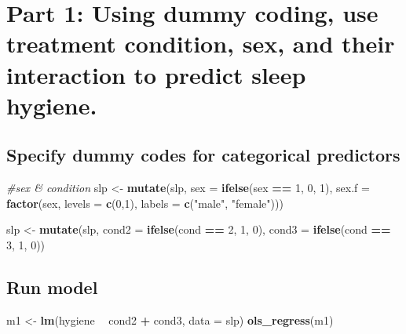 \documentclass[]{article}
\newenvironment{Shaded}{\begin{snugshade}}{\end{snugshade}}
\newcommand{\KeywordTok}[1]{\textcolor[rgb]{0.13,0.29,0.53}{\textbf{#1}}}
\newcommand{\DataTypeTok}[1]{\textcolor[rgb]{0.13,0.29,0.53}{#1}}
\newcommand{\DecValTok}[1]{\textcolor[rgb]{0.00,0.00,0.81}{#1}}
\newcommand{\StringTok}[1]{\textcolor[rgb]{0.31,0.60,0.02}{#1}}
\newcommand{\CommentTok}[1]{\textcolor[rgb]{0.56,0.35,0.01}{\textit{#1}}}
\newcommand{\OperatorTok}[1]{\textcolor[rgb]{0.81,0.36,0.00}{\textbf{#1}}}
\newcommand{\NormalTok}[1]{#1}
\begin{document}
\section{Part 1: Using dummy coding, use treatment condition, sex, and
their interaction to predict sleep
hygiene.}\label{part-1-using-dummy-coding-use-treatment-condition-sex-and-their-interaction-to-predict-sleep-hygiene.}

\subsection{Specify dummy codes for categorical
predictors}\label{specify-dummy-codes-for-categorical-predictors}

\begin{Shaded}
\begin{Highlighting}[]
\CommentTok{#sex & condition}
\NormalTok{slp <-}\StringTok{ }\KeywordTok{mutate}\NormalTok{(slp, }
              \DataTypeTok{sex =} \KeywordTok{ifelse}\NormalTok{(sex }\OperatorTok{==}\StringTok{ }\DecValTok{1}\NormalTok{, }\DecValTok{0}\NormalTok{, }\DecValTok{1}\NormalTok{),}
              \DataTypeTok{sex.f =} \KeywordTok{factor}\NormalTok{(sex, }\DataTypeTok{levels =} \KeywordTok{c}\NormalTok{(}\DecValTok{0}\NormalTok{,}\DecValTok{1}\NormalTok{), }\DataTypeTok{labels =} \KeywordTok{c}\NormalTok{(}\StringTok{"male"}\NormalTok{, }\StringTok{"female"}\NormalTok{)))}

\NormalTok{slp <-}\StringTok{ }\KeywordTok{mutate}\NormalTok{(slp,}
              \DataTypeTok{cond2 =} \KeywordTok{ifelse}\NormalTok{(cond }\OperatorTok{==}\StringTok{ }\DecValTok{2}\NormalTok{, }\DecValTok{1}\NormalTok{, }\DecValTok{0}\NormalTok{),}
              \DataTypeTok{cond3 =} \KeywordTok{ifelse}\NormalTok{(cond }\OperatorTok{==}\StringTok{ }\DecValTok{3}\NormalTok{, }\DecValTok{1}\NormalTok{, }\DecValTok{0}\NormalTok{)) }
\end{Highlighting}
\end{Shaded}

\subsection{Run model}\label{run-model}

\begin{Shaded}
\begin{Highlighting}[]
\NormalTok{m1 <-}\StringTok{ }\KeywordTok{lm}\NormalTok{(hygiene }\OperatorTok{~}\StringTok{ }\NormalTok{cond2 }\OperatorTok{+}\StringTok{ }\NormalTok{cond3, }\DataTypeTok{data =}\NormalTok{ slp)}
\KeywordTok{ols_regress}\NormalTok{(m1)}
\end{Highlighting}
\end{Shaded}
\end{document}
